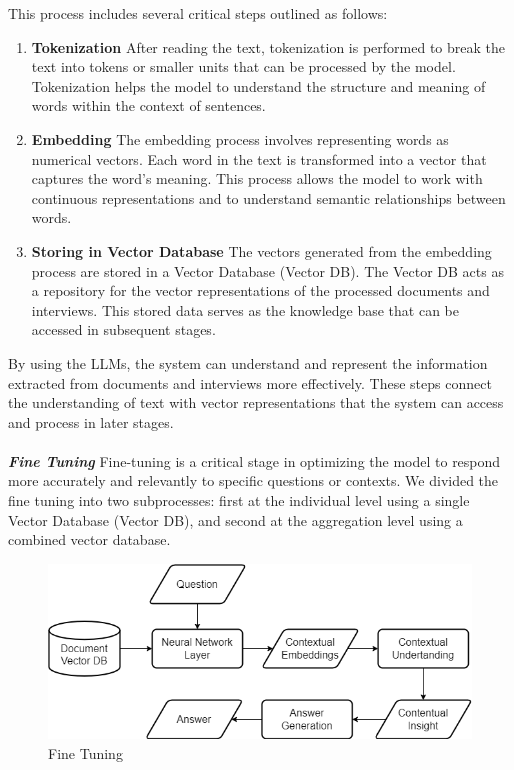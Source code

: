 \documentclass[runningheads]{llncs}
\begin{document}
This process includes several critical steps outlined as follows:

\begin{enumerate}  
    \item \textbf{Tokenization} After reading the text, tokenization is performed to break the text into tokens or smaller units that can be processed by the model. Tokenization helps the model to understand the structure and meaning of words within the context of sentences.
    
    \item \textbf{Embedding} The embedding process involves representing words as numerical vectors. Each word in the text is transformed into a vector that captures the word's meaning. This process allows the model to work with continuous representations and to understand semantic relationships between words.
    
    \item \textbf{Storing in Vector Database} The vectors generated from the embedding process are stored in a Vector Database (Vector DB). The Vector DB acts as a repository for the vector representations of the processed documents and interviews. This stored data serves as the knowledge base that can be accessed in subsequent stages.
\end{enumerate}

By using the LLMs, the system can understand and represent the information extracted from documents and interviews more effectively. These steps connect the understanding of text with vector representations that the system can access and process in later stages.\\ 
\\
\textbf{\textit{Fine Tuning}} Fine-tuning is a critical stage in optimizing the model to respond more accurately and relevantly to specific questions or contexts. We divided the fine tuning into two subprocesses: first at the individual level using a single Vector Database (Vector DB), and second at the aggregation level using a combined vector database.

\begin{figure}[htbp]
    \centerline{\includegraphics[scale=0.4]{eng-fine1.png}}
    \caption{Fine Tuning}
    \label{fig:fine-tuning-1}
\end{figure}
\end{document}
